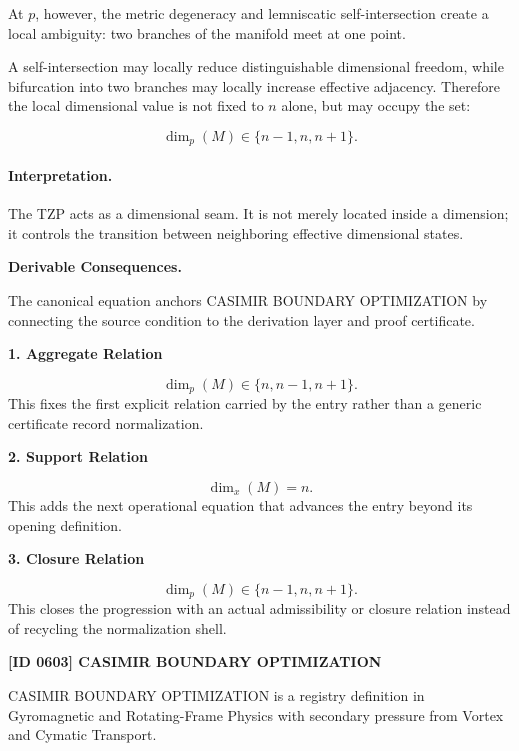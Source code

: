 At $p$, however, the metric degeneracy and lemniscatic self-intersection create a local ambiguity: two branches of the manifold meet at one point.

A self-intersection may locally reduce distinguishable dimensional freedom, while bifurcation into two branches may locally increase effective adjacency. Therefore the local dimensional value is not fixed to $n$ alone, but may occupy the set:

\begin{equation}
\dim_p(M)\in\{n-1,n,n+1\}.
\end{equation}

\paragraph{Interpretation.}
The TZP acts as a dimensional seam. It is not merely located inside a dimension; it controls the transition between neighboring effective dimensional states.

\par\vspace{0.35em}
\noindent\textbf{Derivable Consequences.}\quad
\begingroup
\footnotesize
\raggedright
The canonical equation anchors CASIMIR BOUNDARY OPTIMIZATION by connecting the source condition to the derivation layer and proof certificate.
\par\endgroup

\noindent\textbf{1. Aggregate Relation}\par
\[
\dim_p(M)\in\{n,n-1,n+1\}.
\]
\noindent This fixes the first explicit relation carried by the entry rather than a generic certificate record normalization.\par
\noindent\textbf{2. Support Relation}\par
\[
\dim_x(M)=n.
\]
\noindent This adds the next operational equation that advances the entry beyond its opening definition.\par
\noindent\textbf{3. Closure Relation}\par
\[
\dim_p(M)\in\{n-1,n,n+1\}.
\]
\noindent This closes the progression with an actual admissibility or closure relation instead of recycling the normalization shell.\par

\clearpage
\noindent\textbf{[ID 0603] CASIMIR BOUNDARY OPTIMIZATION}\par
\vspace{0.35em}
\begingroup\small
{}
CASIMIR BOUNDARY OPTIMIZATION is a registry definition in Gyromagnetic and Rotating-Frame Physics with secondary pressure from Vortex and Cymatic Transport.

